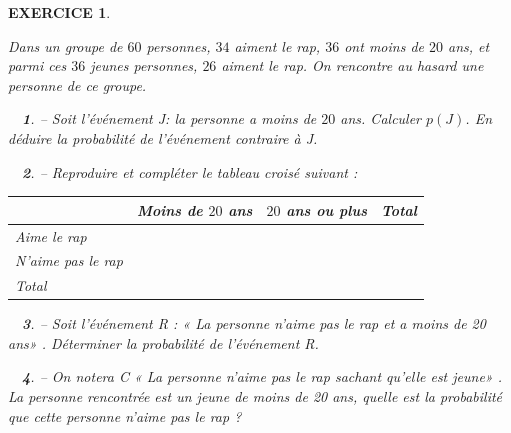\documentclass[a4paper]{article}   %
\renewcommand{\(}{\left(}
\renewcommand{\)}{\right)}
\newtheorem{ques}{~}
\newenvironment{qu}{\begin{ques}--} {\end{ques}}
\newtheorem{EXO}{\large EXERCICE }
\newenvironment{EX}   { \setcounter{ques}{0} \begin{EXO} \hrulefill ~\vspace{0.3cm}

\normalfont}    {\end{EXO} \medskip}
\begin{document}
\begin{EX}
Dans un groupe de $60$ personnes, $34$ aiment le rap, $36$ ont moins de $20$ ans, et parmi ces $36$ jeunes personnes, $26$ aiment le rap. On rencontre au hasard une personne de ce groupe.
\begin{qu} Soit l'événement J: \og la personne a moins de $20$ ans\fg. Calculer $p(J)$. En déduire la probabilité de l'événement contraire à J.
\end{qu}
\begin{qu} Reproduire et compléter le tableau croisé suivant :
\begin{center}
\begin{tabular}{|p{4cm}| p{4cm}| p{4cm}| p{4cm}|}		
\hline							
 & Moins de $20$ ans & $20$ ans ou plus & Total \\
\hline
Aime le rap & & &\\
\hline
N'aime pas le rap & & &\\
\hline
Total & & &\\
\hline
\end{tabular}
\end{center}
\end{qu}
\begin{qu} Soit l’événement R : « La personne n’aime pas le rap et a moins de 20 ans» . Déterminer la
probabilité de l’événement R.
\end{qu}
\begin{qu}
On notera C « La personne n’aime pas le rap sachant qu’elle est jeune» .
La personne rencontrée est un jeune de moins de 20 ans, quelle est la probabilité que cette
personne n’aime pas le rap ?
\end{qu}

\end{EX}
\end{document}

